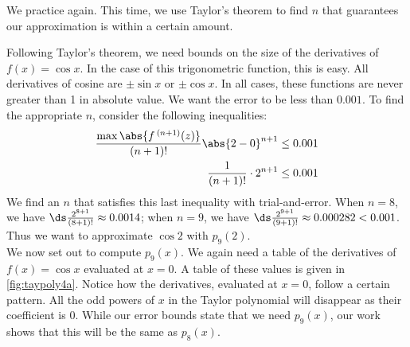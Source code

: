 We practice again. This time, we use Taylor's theorem to find $n$ that guarantees our approximation is within a certain amount.

{Following Taylor's theorem, we need bounds on the size of the derivatives of $f(x)=\cos x$. In the case of this trigonometric function, this is easy. All derivatives of cosine are $\pm \sin x$ or $\pm \cos x$. In all cases, these functions are never greater than 1 in absolute value. We want the error to be less than $0.001$. To find the appropriate $n$, consider the following inequalities:
\begin{align*}
\frac{\max\abs{f\,^{(n+1)}(z)}}{(n+1)!}\abs{2-0}^{n+1} &\leq 0.001 \\
\frac1{(n+1)!}\cdot2^{n+1} &\leq 0.001
\end{align*}
We find an $n$ that satisfies this last inequality with trial-and-error. When $n=8$, we have $\ds \frac{2^{8+1}}{(8+1)!} \approx 0.0014$; when $n=9$, we have $\ds \frac{2^{9+1}}{(9+1)!} \approx 0.000282 <0.001$. Thus we want to approximate $\cos 2$ with $p_9(2)$.\\

We now set out to compute $p_9(x)$. We again need a table of the derivatives of $f(x)=\cos x$ evaluated at $x=0$. A table of these values is given in \autoref{fig:taypoly4a}. Notice how the derivatives, evaluated at $x=0$, follow a certain pattern. All the odd powers of $x$ in the Taylor polynomial will disappear as their coefficient is 0. While our error bounds state that we need $p_9(x)$, our work shows that this will be the same as $p_8(x)$. 

}
